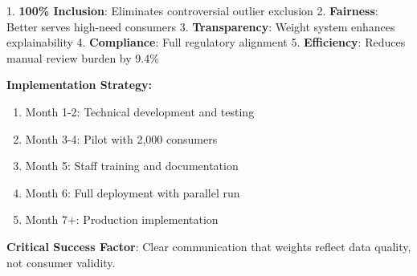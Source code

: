 1. \textbf{100\% Inclusion}: Eliminates controversial outlier exclusion
2. \textbf{Fairness}: Better serves high-need consumers
3. \textbf{Transparency}: Weight system enhances explainability
4. \textbf{Compliance}: Full regulatory alignment
5. \textbf{Efficiency}: Reduces manual review burden by 9.4\%

\textbf{Implementation Strategy:}
\begin{enumerate}
    \item Month 1-2: Technical development and testing
    \item Month 3-4: Pilot with 2,000 consumers
    \item Month 5: Staff training and documentation
    \item Month 6: Full deployment with parallel run
    \item Month 7+: Production implementation
\end{enumerate}

\textbf{Critical Success Factor}: Clear communication that weights reflect data quality, not consumer validity.
